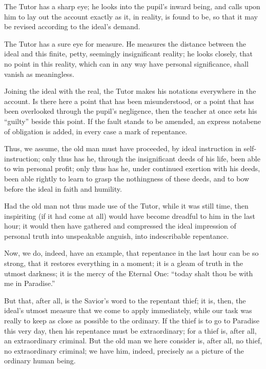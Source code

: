 \documentclass[12pt,a4paper]{book}
\begin{document}
The Tutor has a sharp eye; he looks into the pupil's inward being, and calls upon him to lay out the account exactly as it, in reality, is found to be, so that it may be revised according to the ideal's demand.

The Tutor has a sure eye for measure. He measures the distance between the ideal and this finite, petty, seemingly insignificant reality; he looks closely, that no point in this reality, which can in any way have personal significance, shall vanish as meaningless.

Joining the ideal with the real, the Tutor makes his notations everywhere in the account. Is there here a point that has been misunderstood, or a point that has been overlooked through the pupil's negligence, then the teacher at once sets his ``guilty'' beside this point. If the fault stands to be amended, an express notabene of obligation is added, in every case a mark of repentance.

Thus, we assume, the old man must have proceeded, by ideal instruction in self-instruction; only thus
has he, through the insignificant deeds of his life, been able to win personal profit; only thus has he, under continued exertion with his deeds, been able rightly to learn to grasp the nothingness of these deeds, and to bow before the ideal in faith and humility.

Had the old man not thus made use of the Tutor, while it was still time, then inspiriting (if it had come at all) would have become dreadful to him in the last hour; it would then have gathered and compressed the ideal impression of personal truth into unspeakable anguish, into indescribable repentance.

Now, we do, indeed, have an example, that repentance in the last hour can be so strong, that it restores everything in a moment; it is a gleam of truth in the utmost darkness; it is the mercy of the Eternal One: ``today shalt thou be with me in Paradise.''

But that, after all, is the Savior's word to the repentant thief; it is, then, the ideal's utmost measure that we come to apply immediately, while our task was really to keep as close as possible to the ordinary. If the thief is to go to Paradise this very day, then his repentance must be extraordinary; for a thief is, after all, an extraordinary criminal. But the old man we here consider is, after all, no thief, no extraordinary criminal; we have him, indeed, precisely as a picture of the ordinary human being.
\end{document}

